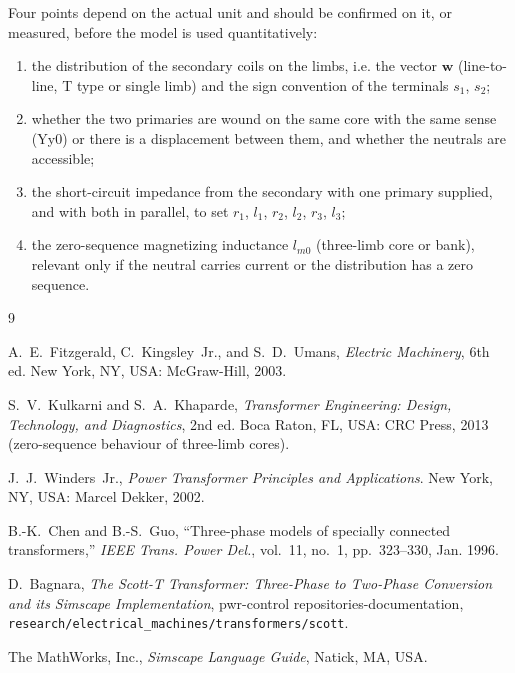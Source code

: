 \documentclass[10pt,a4paper]{scrartcl}
\newcommand{\vect}[1]{\boldsymbol{#1}}
\begin{document}
\begin{onehalfspace}
Four points depend on the actual unit and should be confirmed on it, or measured, before the model is used quantitatively:
\begin{enumerate}
\item the distribution of the secondary coils on the limbs, i.e. the vector $\vect{w}$ (line-to-line, T type or single limb) and the sign convention of the terminals $s_1$, $s_2$;
\item whether the two primaries are wound on the same core with the same sense (Yy0) or there is a displacement between them, and whether the neutrals are accessible;
\item the short-circuit impedance from the secondary with one primary supplied, and with both in parallel, to set $r_1$, $l_1$, $r_2$, $l_2$, $r_3$, $l_3$;
\item the zero-sequence magnetizing inductance $l_{m0}$ (three-limb core or bank), relevant only if the neutral carries current or the distribution has a zero sequence.
\end{enumerate}

\begin{thebibliography}{9}

A.~E.~Fitzgerald, C.~Kingsley~Jr., and S.~D.~Umans,
\emph{Electric Machinery}, 6th ed. New York, NY, USA: McGraw-Hill, 2003.

S.~V.~Kulkarni and S.~A.~Khaparde,
\emph{Transformer Engineering: Design, Technology, and Diagnostics}, 2nd ed.
Boca Raton, FL, USA: CRC Press, 2013 (zero-sequence behaviour of three-limb cores).

J.~J.~Winders~Jr.,
\emph{Power Transformer Principles and Applications}.
New York, NY, USA: Marcel Dekker, 2002.

B.-K.~Chen and B.-S.~Guo,
``Three-phase models of specially connected transformers,''
\emph{IEEE Trans. Power Del.}, vol.~11, no.~1, pp.~323--330, Jan. 1996.

D.~Bagnara, \emph{The Scott-T Transformer: Three-Phase to Two-Phase Conversion and its Simscape Implementation},
pwr-control repositories-documentation, \texttt{research/electrical\_machines/transformers/scott}.

The MathWorks, Inc., \emph{Simscape Language Guide}, Natick, MA, USA.

\end{thebibliography}

\end{onehalfspace}
\end{document}
